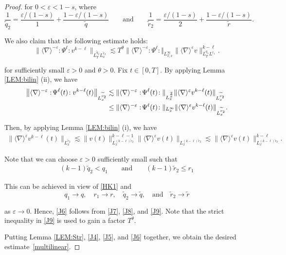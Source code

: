 \documentclass[letterpaper, 11pt,  reqno]{amsart}
\newcommand{\1}{\hspace{0.5mm}\text{I}\hspace{0.5mm}}
\newcommand{\noi}{\noindent}
\newcommand{\nb}{\nabla}
\newcommand{\eps}{\varepsilon}
\newcommand{\wt}{\widetilde}
\renewcommand{\l}{\ell}
\newcommand{\les}{\lesssim}
\newcommand{\jb}[1]
{\langle #1 \rangle}
\numberwithin{equation}{section}
\numberwithin{theorem}{section}
\begin{document}
\begin{proof}
\noi
for $0 <  \eps < 1- s$, where
\[ \frac1{\wt q_2} = \frac{\eps/(1-s)}{1} + \frac{1-\eps/(1-s)}{\wt q}
 \qquad \text{and}\qquad \frac1{\wt r_2} = \frac{\eps/(1-s)}{2} + \frac{1-\eps/(1-s)}{\wt r}   .  \] 


%
%


We also claim  that the following estimate holds:
\begin{equation}  
\big\| \jb{\nb}^{-\eps}  :\!\Psi^\l\!: v^{k-\l} \big\|_{L^{\wt q_2}_T L^{\wt r_2}_x }
 \les T^\theta \| \jb{\nb}^{-\eps} :\!\Psi^\l\!: \Vert_{L^\infty_{T, x}} 
 \|\jb{\nb}^{\eps} v \|^{k-\l}_{L^{q_1}_T L^{r_1}} .
\label{J6}
\end{equation} 


\noi
for sufficiently small $\eps > 0$
and $\theta > 0$.
%
Fix $t \in [0, T]$.  By applying Lemma \ref{LEM:bilin} (ii), we have
\begin{align}
\big\| \jb{\nb}^{-\eps}  :\!\Psi^\l(t)\!: v^{k-\l}(t) \big\|_{ L^{\wt r_2}_x }
& \les \|\jb{\nb}^{-\eps} :\!\Psi^\l(t)\!: \|_{L^\frac{2}{\eps}_x} 
\| \jb{\nb}^{\eps} v^{k-\l} (t)\|_{L^{\wt r_2 }_x} \notag\\
& \le \|\jb{\nb}^{-\eps} :\!\Psi^\l(t)\!: \|_{L^\infty_x} 
\| \jb{\nb}^{\eps} v^{k-\l} (t)\|_{L^{\wt r_2 }_x} .
\label{J7}
\end{align}


\noi
Then, by applying Lemma \ref{LEM:bilin} (i), we have
\begin{align} 
\|\jb{\nb}^{\eps} v^{k-\l}(t)  \|_{L^{\wt r_2}_x}
 \les   \| v (t) \|_{L^{(k-\l)\wt r_2}_x}^{k-\l-1} \|\jb{\nb}^{\eps} v (t) \|_{L^{(k-\l) \wt r_2}_x}
 \les   \|\jb{\nb}^{\eps} v(t) \|^{k-\l}_{L^{(k-\l) \wt r_2}_x}.
\label{J8}
\end{align}

\noi
Note that we can choose $\eps > 0$ sufficiently small such that 
\begin{align}
  (k-1) \wt q_2 <  q_1 \qquad \text{and} \qquad (k-1) \wt r_2 \le r_1 
  \label{J9}
\end{align}

\noi
This can be achieved in view of \eqref{HK1} and 
\[ q_1 \to q, \quad  r_1 \to r, \quad \wt q_2 \to \wt q ,\quad \text{and} \quad  \wt r_2 \to \wt r \] 

\noi
as $\eps \to 0$.
Hence, \eqref{J6} follows from \eqref{J7}, \eqref{J8}, and \eqref{J9}. 
Note that the strict inequality in \eqref{J9} is used to gain a factor $T^\theta$.





Putting 
 Lemma \ref{LEM:Str},  \eqref{J4}, \eqref{J5}, and \eqref{J6} together, 
we obtain the desired estimate~\eqref{multilinear}.
\end{proof} 
\end{document}
